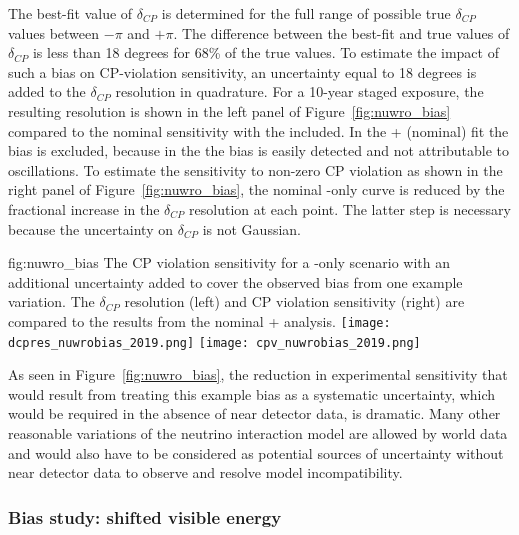 The best-fit value of $\delta_{CP}$ is determined for the full range of possible true $\delta_{CP}$ values between $-\pi$ and $+\pi$. The difference between the best-fit and true values of $\delta_{CP}$ is less than 18 degrees for 68\% of the true values. To estimate the impact of such a bias on CP-violation sensitivity, an uncertainty equal to 18 degrees is added to the $\delta_{CP}$ resolution in quadrature. For a 10-year staged   exposure, the resulting resolution is shown in the left panel of Figure~\ref{fig:nuwro_bias} compared to the nominal sensitivity with the  included. In the + (nominal) fit the bias is excluded, because in the  the bias is easily detected and not attributable to oscillations. To estimate the sensitivity to non-zero CP violation as shown in the right panel of Figure~\ref{fig:nuwro_bias}, the nominal -only curve is reduced by the fractional increase in the $\delta_{CP}$ resolution at each point. The latter step is necessary because the uncertainty on $\delta_{CP}$ is not Gaussian.

\begin{dunefigure}{fig:nuwro_bias}
{The CP violation sensitivity for a -only scenario with an additional uncertainty added to cover the observed bias from one example variation. The $\delta_{CP}$ resolution (left) and CP violation sensitivity (right) are compared to the results from the nominal + analysis.}
  \texttt{[image: dcpres\_nuwrobias\_2019.png]}
  \texttt{[image: cpv\_nuwrobias\_2019.png]}
\end{dunefigure}

As seen in Figure~\ref{fig:nuwro_bias}, the reduction in experimental sensitivity that would result from treating this example bias as a systematic uncertainty, which would be required in the absence of near detector data, is dramatic. Many other reasonable variations of the neutrino interaction model are allowed by world data and would also have to be considered as potential sources of uncertainty without near detector data to observe and resolve model incompatibility. 

\subsubsection{Bias study: shifted visible energy}
\label{sec:missingProtonMD}

